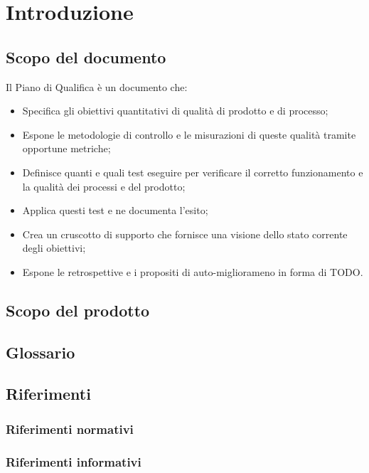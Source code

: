 \chapter{Introduzione}
\section{Scopo del documento}
Il Piano di Qualifica è un documento che:
\begin{itemize}
    \item Specifica gli obiettivi
    quantitativi di qualità di prodotto e di processo;
    \item Espone le
    metodologie di controllo e le misurazioni di queste qualità tramite
    opportune metriche;
    \item Definisce quanti e quali test eseguire per verificare il corretto funzionamento
    e la qualità dei processi e del prodotto;
    \item Applica questi test e ne documenta l'esito;
    \item Crea un cruscotto di supporto che fornisce
    una visione dello stato corrente degli obiettivi;
    \item Espone le retrospettive e i propositi di auto-migliorameno
    in forma di TODO.
\end{itemize}
\section{Scopo del prodotto}
\section{Glossario}
\section{Riferimenti}
\subsection{Riferimenti normativi}
\subsection{Riferimenti informativi}
